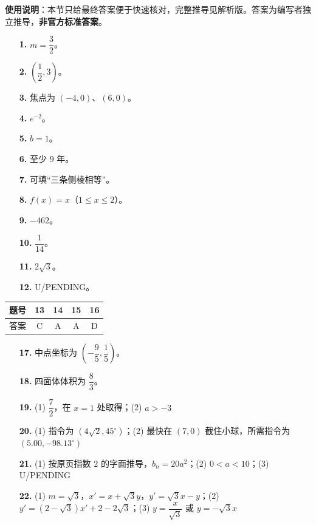 
\begin{gknotice}
\textbf{使用说明}：本节只给最终答案便于快速核对，完整推导见解析版。答案为编写者独立推导，\textbf{非官方标准答案}。
\end{gknotice}

\begin{itemize}[leftmargin=2.6em]
  \item[\textbf{1.}] $m=\dfrac32$。
  \item[\textbf{2.}] $\left(\dfrac12,3\right)$。
  \item[\textbf{3.}] 焦点为 $(-4,0)$、$(6,0)$。
  \item[\textbf{4.}] $e^{-2}$。
  \item[\textbf{5.}] $b=1$。
  \item[\textbf{6.}] 至少 $9$ 年。
  \item[\textbf{7.}] 可填“三条侧棱相等”。
  \item[\textbf{8.}] $f(x)=x$（$1\leq x\leq2$）。
  \item[\textbf{9.}] $-462$。
  \item[\textbf{10.}] $\dfrac1{14}$。
  \item[\textbf{11.}] $2\sqrt3$。
  \item[\textbf{12.}] U/PENDING。
\end{itemize}

\begin{center}\begin{tabular}{ccccc}
\toprule
题号 & 13 & 14 & 15 & 16 \\
\midrule
答案 & C & A & A & D \\
\bottomrule
\end{tabular}\end{center}

\begin{itemize}[leftmargin=2.6em]
  \item[\textbf{17.}] 中点坐标为 $\left(-\dfrac95,\dfrac15\right)$。
  \item[\textbf{18.}] 四面体体积为 $\dfrac83$。
  \item[\textbf{19.}] (1) $\dfrac72$，在 $x=1$ 处取得；(2) $a>-3$
  \item[\textbf{20.}] (1) 指令为 $(4\sqrt2,45^\circ)$；(2) 最快在 $(7,0)$ 截住小球，所需指令为 $(5.00,-98.13^\circ)$
  \item[\textbf{21.}] (1) 按原页指数 $2$ 的字面推导，$b_n=20a^2$；(2) $0<a<10$；(3) U/PENDING
  \item[\textbf{22.}] (1) $m=\sqrt3$，$x'=x+\sqrt3y$，$y'=\sqrt3x-y$；(2) $y'=(2-\sqrt3)x'+2-2\sqrt3$；(3) $y=\dfrac{x}{\sqrt3}$ 或 $y=-\sqrt3x$
\end{itemize}
